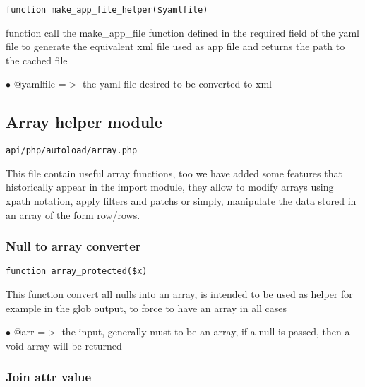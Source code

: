 \documentclass[a4paper]{article}
\begin{document}
\begin{lstlisting}
function make_app_file_helper($yamlfile)
\end{lstlisting}

function call the make\_app\_file function defined in the required
field of the yaml file to generate the equivalent xml file used
as app file and returns the path to the cached file

\begin{compactitem}
\item[\color{myblue}$\bullet$] @yamlfile =$>$ the yaml file desired to be converted to xml
\end{compactitem}

\hypertarget{toc50}{}
\subsection{Array helper module}

\begin{lstlisting}
api/php/autoload/array.php
\end{lstlisting}

This file contain useful array functions, too we have added some features
that historically appear in the import module, they allow to modify arrays
using xpath notation, apply filters and patchs or simply, manipulate the
data stored in an array of the form row/rows.

\hypertarget{toc51}{}
\subsubsection{Null to array converter}

\begin{lstlisting}
function array_protected($x)
\end{lstlisting}

This function convert all nulls into an array, is intended to be
used as helper for example in the glob output, to force to have
an array in all cases

\begin{compactitem}
\item[\color{myblue}$\bullet$] @arr =$>$ the input, generally must to be an array, if a null is passed,
        then a void array will be returned
\end{compactitem}

\hypertarget{toc52}{}
\subsubsection{Join attr value}
\end{document}
